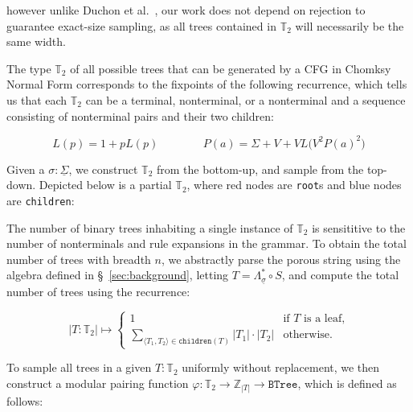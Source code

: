 \documentclass[sigplan,review,anonymous,acmsmall]{acmart}\settopmatter{printfolios=false,printccs=false,printacmref=false}
\begin{document}
\noindent however unlike Duchon et al.~\cite{duchon2004boltzmann}, our work does not depend on rejection to guarantee exact-size sampling, as all trees contained in $\mathbb{T}_2$ will necessarily be the same width.

The type $\mathbb{T}_2$ of all possible trees that can be generated by a CFG in Chomksy Normal Form corresponds to the fixpoints of the following recurrence, which tells us that each $\mathbb{T}_2$ can be a terminal, nonterminal, or a nonterminal and a sequence consisting of nonterminal pairs and their two children:\vspace{-10pt}

\begin{equation*}
  L(p) = 1 + p L(p) \phantom{addspace} P(a) = \Sigma + V + V L\big(V^2P(a)^2\big)
\end{equation*}

Given a $\sigma: \underline\Sigma$, we construct $\mathbb{T}_2$ from the bottom-up, and sample from the top-down. Depicted below is a partial $\mathbb{T}_2$, where red nodes are \texttt{root}s and blue nodes are \texttt{children}:


The number of binary trees inhabiting a single instance of $\mathbb{T}_2$ is sensititive to the number of nonterminals and rule expansions in the grammar. To obtain the total number of trees with breadth $n$, we abstractly parse the porous string using the algebra defined in \S~\ref{sec:background}, letting $T=\Lambda_{\underline\sigma}^* \circ S$, and compute the total number of trees using the recurrence:

\begin{equation*}
  |T: \mathbb{T}_2| \mapsto \begin{cases}
    1  & \text{if $T$ is a leaf,} \\
    \sum_{\langle T_1, T_2\rangle \in \texttt{children}(T)} |T_1| \cdot |T_2| & \text{otherwise.}
  \end{cases}
\end{equation*}

To sample all trees in a given $T: \mathbb{T}_2$ uniformly without replacement, we then construct a modular pairing function $\varphi: \mathbb{T}_2 \rightarrow \mathbb{Z}_{|T|} \rightarrow \texttt{BTree}$, which is defined as follows:
\end{document}
